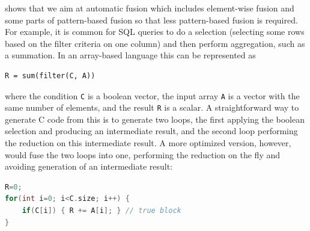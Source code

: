  shows that we aim at automatic fusion which includes
element-wise fusion and some parts of pattern-based fusion so that less
pattern-based fusion is required.
For example, it is common for SQL queries to do a selection (selecting some
rows based on the filter criteria on one column) and then perform aggregation,
such as a summation.  In an array-based language this can be represented as

\begin{small}
\begin{Verbatim}[xleftmargin=.3\columnwidth]
R = sum(filter(C, A))
\end{Verbatim}
\end{small}


\noindent{}where the condition \texttt{C} is a boolean vector, the input array \texttt{A}
is a vector with the same number of elements, and the result \texttt{R} is a
scalar.  A straightforward way to generate C code from this is to generate two loops, the first applying the boolean selection and producing an intermediate result, and the second loop performing the reduction on this intermediate result.  A more optimized version, however, would fuse the two loops into one, performing the reduction on the fly and avoiding generation of an intermediate result:

\begin{center}
\begin{minipage}{\linewidth}
\begin{small}
\begin{lstlisting}[language=C, frame=single, xleftmargin=0mm, xrightmargin=5mm]
R=0;
for(int i=0; i<C.size; i++) {
    if(C[i]) { R += A[i]; } // true block
}
\end{lstlisting}
\end{small}
\end{minipage}
\end{center}



